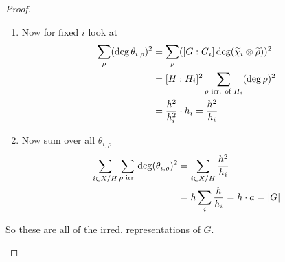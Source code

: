 \documentclass[a4paper]{article}
\begin{document}
\begin{prop} [Proposition 25]
\begin{proof}
\begin{enumerate}[(a)]
\begin{enumerate}[1.]
          \item Now for fixed $i$ look at
                \begin{align}
                  \sum_{\rho} (\deg \theta_{i, \rho})^{2} &= \sum_{\rho} ([G:G_{i}]\deg(\widetilde \chi_{i} \otimes \widetilde \rho))^{2} \\
                                            &= [H:H_{i}]^{2}\sum_{\rho \text{ irr. of }H_{i}} (\deg \rho)^{2} \\
                                            &= \frac {h^{2}}{h_{i}^{2}} \cdot h_{i} = \frac {h^{2}}{h_{i}}
                \end{align}
                \item Now sum over all $\theta_{i,\rho}$
                \begin{align}
                  \sum_{i \in X/H} \sum_{\rho \text{ irr.}} \deg(\theta_{i,\rho})^{2} &= \sum_{i \in X/H} \frac {h^{2}}{h_{i}} \\
                  &= h\sum_{i} \frac h{h_{i}} = h \cdot a = |G|
                \end{align}
        \end{enumerate}
        So these are all of the irred. representations of $G$.
\end{enumerate}
\end{proof}
\end{prop}
\end{document}
